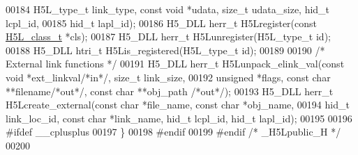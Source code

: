 \begin{DoxyCode}
00184     H5L\_type\_t link\_type, \textcolor{keyword}{const} \textcolor{keywordtype}{void} *udata, \textcolor{keywordtype}{size\_t} udata\_size, hid\_t lcpl\_id,
00185     hid\_t lapl\_id);
00186 H5\_DLL herr\_t H5Lregister(\textcolor{keyword}{const} \hyperlink{struct_h5_l__class__t}{H5L\_class\_t} *cls);
00187 H5\_DLL herr\_t H5Lunregister(H5L\_type\_t \textcolor{keywordtype}{id});
00188 H5\_DLL htri\_t H5Lis\_registered(H5L\_type\_t \textcolor{keywordtype}{id});
00189 
00190 \textcolor{comment}{/* External link functions */}
00191 H5\_DLL herr\_t H5Lunpack\_elink\_val(\textcolor{keyword}{const} \textcolor{keywordtype}{void} *ext\_linkval\textcolor{comment}{/*in*/}, \textcolor{keywordtype}{size\_t} link\_size,
00192    \textcolor{keywordtype}{unsigned} *flags, \textcolor{keyword}{const} \textcolor{keywordtype}{char} **filename\textcolor{comment}{/*out*/}, \textcolor{keyword}{const} \textcolor{keywordtype}{char} **obj\_path \textcolor{comment}{/*out*/});
00193 H5\_DLL herr\_t H5Lcreate\_external(\textcolor{keyword}{const} \textcolor{keywordtype}{char} *file\_name, \textcolor{keyword}{const} \textcolor{keywordtype}{char} *obj\_name,
00194     hid\_t link\_loc\_id, \textcolor{keyword}{const} \textcolor{keywordtype}{char} *link\_name, hid\_t lcpl\_id, hid\_t lapl\_id);
00195 
00196 \textcolor{preprocessor}{#ifdef \_\_cplusplus}
00197 \}
00198 \textcolor{preprocessor}{#endif}
00199 \textcolor{preprocessor}{#endif }\textcolor{comment}{/* \_H5Lpublic\_H */}\textcolor{preprocessor}{}
00200 
\end{DoxyCode}
